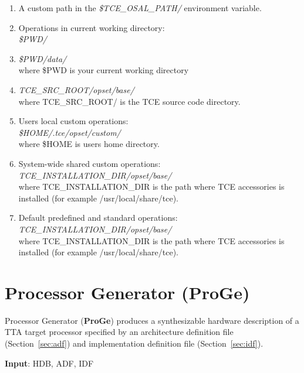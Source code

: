 \documentclass[twoside]{tceusermanual}
\begin{document}
\begin{enumerate}

\item
   A custom path in the \textit{\$TCE\_OSAL\_PATH/} environment variable. 

\item
   Operations in current working directory:\\
   \textit{\$PWD/}
      
\item
   \textit{\$PWD/data/} \\ where \$PWD is your current working directory
      

\item
   \textit{TCE\_SRC\_ROOT/opset/base/} \\ where TCE\_SRC\_ROOT/ is the
   TCE source code directory.

\item
   Users local custom operations: \\
   \textit{\$HOME/.tce/opset/custom/} \\ where \$HOME is users home directory.

\item
   System-wide shared custom operations:
   \textit{TCE\_INSTALLATION\_DIR/opset/base/} \\ where
   TCE\_INSTALLATION\_DIR is the path where TCE accessories is installed (for
   example /usr/local/share/tce).

\item
   Default predefined and standard operations: \\
   \textit{TCE\_INSTALLATION\_DIR/opset/base/} \\ where
   TCE\_INSTALLATION\_DIR is the path where TCE accessories is installed (for
   example /usr/local/share/tce).

\end{enumerate}


\section{Processor Generator (ProGe)}
\label{sec:proge}

Processor Generator (\textbf{ProGe}) produces a synthesizable hardware
description of a TTA target processor specified by an architecture
definition file (Section~\ref{sec:adf}) and implementation definition file
(Section~\ref{sec:idf}).

\textbf{Input}: HDB, ADF, IDF
\end{document}
